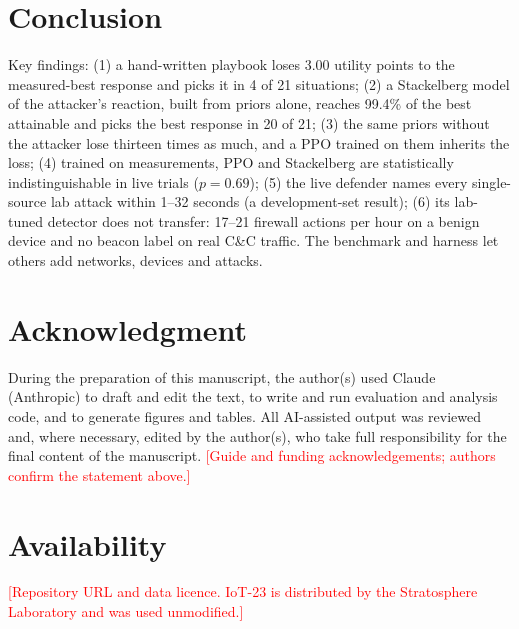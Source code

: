 \documentclass[conference]{IEEEtran}
\newcommand{\todo}[1]{\textcolor{red}{[#1]}}
\begin{document}
\section{Conclusion}
\label{sec:conclusion}
Key findings: (1) a hand-written playbook loses 3.00 utility points to the measured-best response and picks it in 4 of 21 situations; (2) a Stackelberg model of the attacker's reaction, built from priors alone, reaches 99.4\% of the best attainable and picks the best response in 20 of 21; (3) the same priors without the attacker lose thirteen times as much, and a PPO trained on them inherits the loss; (4) trained on measurements, PPO and Stackelberg are statistically indistinguishable in live trials ($p=0.69$); (5) the live defender names every single-source lab attack within 1--32 seconds (a development-set result); (6) its lab-tuned detector does not transfer: 17--21 firewall actions per hour on a benign device and no beacon label on real C\&C traffic. The benchmark and harness let others add networks, devices and attacks.

\section*{Acknowledgment}
During the preparation of this manuscript, the author(s) used Claude (Anthropic) to draft and edit the text, to write and run evaluation and analysis code, and to generate figures and tables. All AI-assisted output was reviewed and, where necessary, edited by the author(s), who take full responsibility for the final content of the manuscript. \todo{Guide and funding acknowledgements; authors confirm the statement above.}

\section*{Availability}
\todo{Repository URL and data licence. IoT-23 is distributed by the Stratosphere Laboratory and was used unmodified.}

\balance


\end{document}
